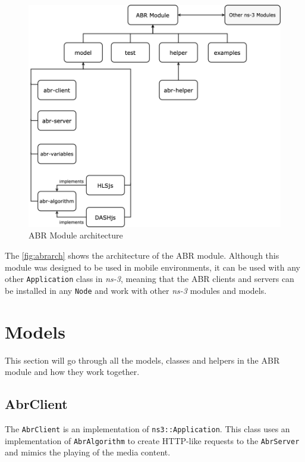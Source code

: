 \begin{figure}[]
  \centering
  \includegraphics[width=\textwidth]{img/abr.png}
  \caption{ABR Module architecture}
  \label{fig:abrarch}
\end{figure}

The \autoref{fig:abrarch} shows the architecture of the ABR module. Although this module 
was designed to be used in mobile environments, it can be used with any other \texttt{Application} 
class in \textit{ns-3}, meaning that the ABR clients and servers can be installed in any \texttt{Node}
and work with other \textit{ns-3} modules and models.


\section{Models}
\label{sec:abrmodels}
This section will go through all the models, classes and helpers in the ABR module and how they work 
together.


\subsection{AbrClient}
The \texttt{AbrClient} is an implementation of \texttt{ns3::Application}. This class 
uses an implementation of \texttt{AbrAlgorithm} to create HTTP-like requests to the 
\texttt{AbrServer} and mimics the playing of the media content.

